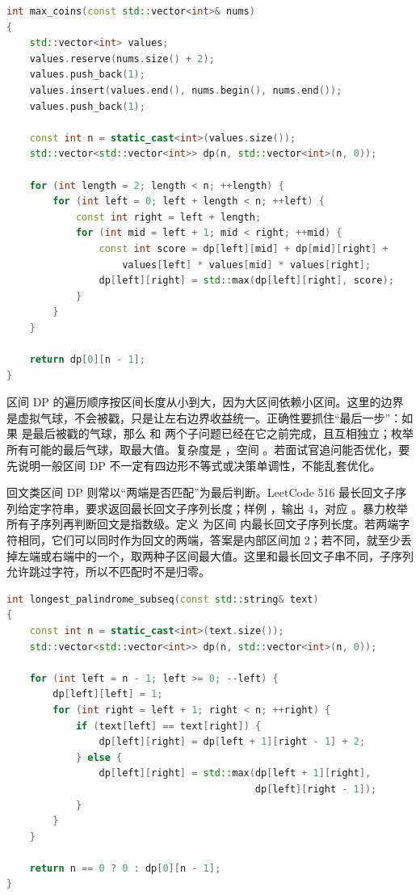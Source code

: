 \begin{lstlisting}[language=C++,caption={LeetCode 312 戳气球：选择最后一个被戳的气球}]
int max_coins(const std::vector<int>& nums)
{
    std::vector<int> values;
    values.reserve(nums.size() + 2);
    values.push_back(1);
    values.insert(values.end(), nums.begin(), nums.end());
    values.push_back(1);

    const int n = static_cast<int>(values.size());
    std::vector<std::vector<int>> dp(n, std::vector<int>(n, 0));

    for (int length = 2; length < n; ++length) {
        for (int left = 0; left + length < n; ++left) {
            const int right = left + length;
            for (int mid = left + 1; mid < right; ++mid) {
                const int score = dp[left][mid] + dp[mid][right] +
                    values[left] * values[mid] * values[right];
                dp[left][right] = std::max(dp[left][right], score);
            }
        }
    }

    return dp[0][n - 1];
}
\end{lstlisting}

区间 DP 的遍历顺序按区间长度从小到大，因为大区间依赖小区间。这里的边界  是虚拟气球，不会被戳，只是让左右边界收益统一。正确性要抓住“最后一步”：如果  是最后被戳的气球，那么  和  两个子问题已经在它之前完成，且互相独立；枚举所有可能的最后气球，取最大值。复杂度是 ，空间 。若面试官追问能否优化，要先说明一般区间 DP 不一定有四边形不等式或决策单调性，不能乱套优化。

回文类区间 DP 则常以“两端是否匹配”为最后判断。LeetCode 516 最长回文子序列给定字符串，要求返回最长回文子序列长度；样例 ，输出 4，对应 。暴力枚举所有子序列再判断回文是指数级。定义  为区间  内最长回文子序列长度。若两端字符相同，它们可以同时作为回文的两端，答案是内部区间加 2；若不同，就至少丢掉左端或右端中的一个，取两种子区间最大值。这里和最长回文子串不同，子序列允许跳过字符，所以不匹配时不是归零。

\begin{lstlisting}[language=C++,caption={LeetCode 516 最长回文子序列：两端字符决定转移}]
int longest_palindrome_subseq(const std::string& text)
{
    const int n = static_cast<int>(text.size());
    std::vector<std::vector<int>> dp(n, std::vector<int>(n, 0));

    for (int left = n - 1; left >= 0; --left) {
        dp[left][left] = 1;
        for (int right = left + 1; right < n; ++right) {
            if (text[left] == text[right]) {
                dp[left][right] = dp[left + 1][right - 1] + 2;
            } else {
                dp[left][right] = std::max(dp[left + 1][right],
                                           dp[left][right - 1]);
            }
        }
    }

    return n == 0 ? 0 : dp[0][n - 1];
}
\end{lstlisting}

